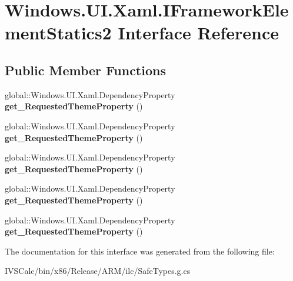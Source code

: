\hypertarget{interface_windows_1_1_u_i_1_1_xaml_1_1_i_framework_element_statics2}{}\section{Windows.\+U\+I.\+Xaml.\+I\+Framework\+Element\+Statics2 Interface Reference}
\label{interface_windows_1_1_u_i_1_1_xaml_1_1_i_framework_element_statics2}
\subsection*{Public Member Functions}
\begin{DoxyCompactItemize}
\item 
\mbox{\label{interface_windows_1_1_u_i_1_1_xaml_1_1_i_framework_element_statics2_a80b66bd3e22e0e80091057182ccfa2a4}} 
global\+::\+Windows.\+U\+I.\+Xaml.\+Dependency\+Property {\bfseries get\+\_\+\+Requested\+Theme\+Property} ()
\item 
\mbox{\label{interface_windows_1_1_u_i_1_1_xaml_1_1_i_framework_element_statics2_a80b66bd3e22e0e80091057182ccfa2a4}} 
global\+::\+Windows.\+U\+I.\+Xaml.\+Dependency\+Property {\bfseries get\+\_\+\+Requested\+Theme\+Property} ()
\item 
\mbox{\label{interface_windows_1_1_u_i_1_1_xaml_1_1_i_framework_element_statics2_a80b66bd3e22e0e80091057182ccfa2a4}} 
global\+::\+Windows.\+U\+I.\+Xaml.\+Dependency\+Property {\bfseries get\+\_\+\+Requested\+Theme\+Property} ()
\item 
\mbox{\label{interface_windows_1_1_u_i_1_1_xaml_1_1_i_framework_element_statics2_a80b66bd3e22e0e80091057182ccfa2a4}} 
global\+::\+Windows.\+U\+I.\+Xaml.\+Dependency\+Property {\bfseries get\+\_\+\+Requested\+Theme\+Property} ()
\item 
\mbox{\label{interface_windows_1_1_u_i_1_1_xaml_1_1_i_framework_element_statics2_a80b66bd3e22e0e80091057182ccfa2a4}} 
global\+::\+Windows.\+U\+I.\+Xaml.\+Dependency\+Property {\bfseries get\+\_\+\+Requested\+Theme\+Property} ()
\end{DoxyCompactItemize}


The documentation for this interface was generated from the following file\+:\begin{DoxyCompactItemize}
\item 
I\+V\+S\+Calc/bin/x86/\+Release/\+A\+R\+M/ilc/Safe\+Types.\+g.\+cs\end{DoxyCompactItemize}
